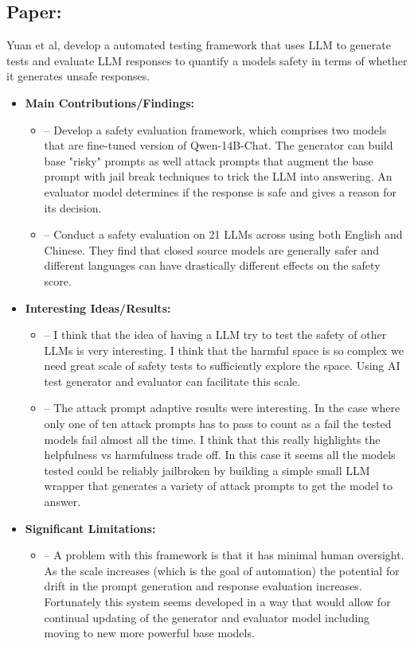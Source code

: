 \documentclass{article}[11pt]
\newcommand{\paperdetails}[5]{
\subsection*{Paper: \fullcite{#1}}
#2
\begin{itemize}
    \item \textbf{Main Contributions/Findings:}
    \begin{itemize}
        #3
    \end{itemize}
    \item \textbf{Interesting Ideas/Results:}
    \begin{itemize}
        #4
    \end{itemize}
    \item \textbf{Significant Limitations:}
    \begin{itemize}
        #5
    \end{itemize}
\end{itemize}
}
\begin{document}
\begin{mdframed}[]
\paperdetails{yuanSEvalAutomatedComprehensive2025}{
    Yuan et al, develop a automated testing framework that uses LLM to generate tests and evaluate LLM responses to quantify a models safety in terms of whether it generates unsafe responses.
}{
    \item [--] Develop a safety evaluation framework, which comprises two models that are fine-tuned version of Qwen-14B-Chat. The generator can build base "risky" prompts as well attack prompts that augment the base prompt with jail break techniques to trick the LLM into answering. An evaluator model determines if the response is safe and gives a reason for its decision.
    \item [--] Conduct a safety evaluation on 21 LLMs across using both English and Chinese. They find that closed source models are generally safer and different languages can have drastically different effects on the safety score.
}{
    \item [--] I think that the idea of having a LLM try to test the safety of other LLMs is very interesting. I think that the harmful space is so complex we need great scale of safety tests to sufficiently explore the space. Using AI test generator and evaluator can facilitate this scale.
    \item [--] The attack prompt adaptive results were interesting. In the case where only one of ten attack prompts has to pass to count as a fail the tested models fail almost all the time. I think that this really highlights the helpfulness vs harmfulness trade off. In this case it seems all the models tested could be reliably jailbroken by building a simple small LLM wrapper that generates a variety of attack prompts to get the model to answer.
}{
    \item [--] A problem with this framework is that it has minimal human oversight. As the scale increases (which is the goal of automation) the potential for drift in the prompt generation and response evaluation increases. Fortunately this system seems developed in a way that would allow for continual updating of the generator and evaluator model including moving to new more powerful base models.
}
\end{mdframed}
\end{document}
